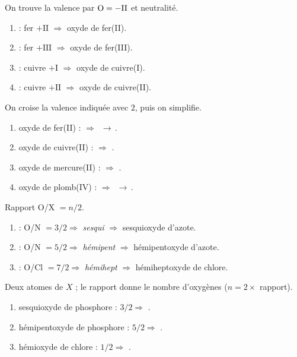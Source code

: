 \documentclass[11pt,a4paper]{article}
\begin{document}
\begin{corrige}
On trouve la valence par $\ce{O}=-\mathrm{II}$ et neutralité.
\begin{enumerate}[label=\alph*)]
  \item {} : fer $+\mathrm{II}$ $\Rightarrow$ oxyde de fer(II).
  \item {} : fer $+\mathrm{III}$ $\Rightarrow$ oxyde de fer(III).
  \item {} : cuivre $+\mathrm{I}$ $\Rightarrow$ oxyde de cuivre(I).
  \item {} : cuivre $+\mathrm{II}$ $\Rightarrow$ oxyde de cuivre(II).
\end{enumerate}
\end{corrige}

\begin{corrige}
On croise la valence indiquée avec $2$, puis on simplifie.
\begin{enumerate}[label=\alph*)]
  \item oxyde de fer(II) :  $\Rightarrow$ \,$\to$\,.
  \item oxyde de cuivre(II) :  $\Rightarrow$ .
  \item oxyde de mercure(II) :  $\Rightarrow$ .
  \item oxyde de plomb(IV) :  $\Rightarrow$ \,$\to$\,.
\end{enumerate}
\end{corrige}

\begin{corrige}
Rapport O/X $=n/2$.
\begin{enumerate}[label=\alph*)]
  \item {} : O/N $=3/2 \Rightarrow$ \emph{sesqui} $\Rightarrow$ sesquioxyde d'azote.
  \item {} : O/N $=5/2 \Rightarrow$ \emph{hémipent} $\Rightarrow$ hémipentoxyde d'azote.
  \item {} : O/Cl $=7/2 \Rightarrow$ \emph{hémihept} $\Rightarrow$ hémiheptoxyde de chlore.
\end{enumerate}
\end{corrige}

\begin{corrige}
Deux atomes de $X$ ; le rapport donne le nombre d'oxygènes ($n = 2 \times$ rapport).
\begin{enumerate}[label=\alph*)]
  \item sesquioxyde de phosphore : $3/2 \Rightarrow$ .
  \item hémipentoxyde de phosphore : $5/2 \Rightarrow$ .
  \item hémioxyde de chlore : $1/2 \Rightarrow$ .
\end{enumerate}
\end{corrige}
\end{document}
